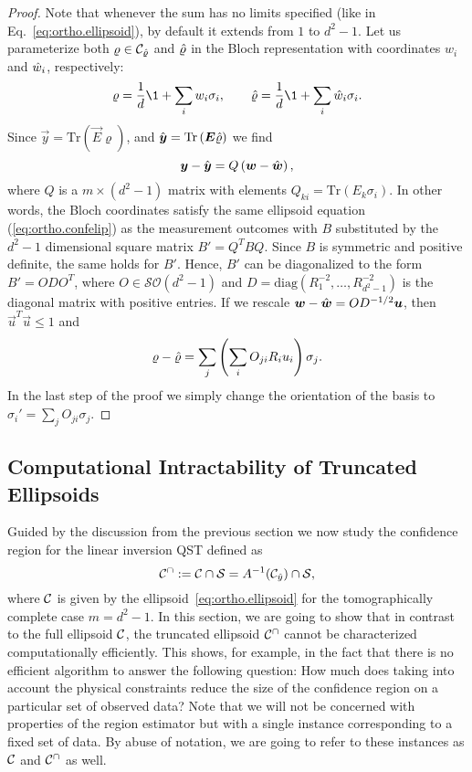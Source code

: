 \begin{proof}
  Note that whenever the sum has no limits specified (like in Eq.~\eqref{eq:ortho.ellipsoid}), by default it extends from $1$ to $d^{2}-1$.
  Let us parameterize both $\varrho \in \mathcal{C}_{\hat{\varrho}}$ and $\hat{\varrho}$ in the Bloch representation with coordinates $w_{i}$ and $\hat{w}_i$, respectively:
  \[
    \varrho=\frac{1}{d}\1 + \sum_{i}w_{i}\sigma_{i},
    \qquad\estim{\varrho}=\frac{1}{d} \1 + \sum_{i}\estim{w}_{i}\sigma_{i}.
  \]
  Since $\vec{y}=\textrm{Tr}\left(\vec{E}\varrho\right)$, and $\hat{\boldsymbol{y}}=\textrm{Tr}\left(\boldsymbol{E}\hat{\varrho}\right)$ we find
  \[
    \boldsymbol{y}-\hat{\boldsymbol{y}}=Q\left(\boldsymbol{w}-\hat{\boldsymbol{w}}\right),
  \]
  where $Q$ is a $m\times(d^{2}-1)$ matrix with elements $Q_{ki}=\textrm{Tr}\left(E_{k}\sigma_{i}\right)$.
  In other words, the Bloch coordinates satisfy the same ellipsoid equation (\ref{eq:ortho.confelip}) as the measurement outcomes with $B$ substituted by the $d^{2}-1$ dimensional square matrix $B'=Q^{T}BQ$.
  Since $B$ is symmetric and positive definite, the same holds for $B'$.
  Hence, $B'$ can be diagonalized to the form $B'=ODO^{T}$, where $O \in \mathcal{SO}(d^2 - 1)$ and $D=\textrm{diag}(R_{1}^{-2},\ldots,R_{d^{2}-1}^{-2})$ is the diagonal matrix with positive entries.
  If we rescale $\boldsymbol{w}-\hat{\boldsymbol{w}}=OD^{-1/2}\boldsymbol{u}$, then $\vec{u}^{T}\vec{u}\leq1$ and
  \[
    \varrho-\hat{\varrho}=\sum_{j}\left(\sum_{i}O_{ji}R_{i}u_{i}\right)\sigma_{j}.
  \]
  In the last step of the proof we simply change the orientation of the basis to $\sigma_{i}'=\sum_{j}O_{ji}\sigma_{j}$.
\end{proof}


\subsection{Computational Intractability of Truncated Ellipsoids}
\label{sub:ortho.hard}

Guided by the discussion from the previous section we now study the confidence region for the linear inversion QST defined as
\[
  \label{eq:ortho.truncated_ellipsoid}
  \mathcal{C}^\cap := \mathcal{C} \cap \mathcal{S} = A^{-1}(\mathcal{C}_{\hat{y}}) \cap \mathcal{S},
\]
where $\mathcal{C}$ is given by the ellipsoid~\eqref{eq:ortho.ellipsoid} for the tomographically complete case $m=d^2 - 1$.
In this section, we are going to show that in contrast to the full ellipsoid $\mathcal{C}$, the truncated ellipsoid $\mathcal{C}^\cap$ cannot be characterized computationally efficiently.
This shows, for example, in the fact that there is no efficient algorithm to answer the following question:
How much does taking into account the physical constraints reduce the size of the confidence region on a particular set of observed data?
Note that we will not be concerned with properties of the region estimator but with a single instance corresponding to a fixed set of data.
By abuse of notation, we are going to refer to these instances as $\mathcal{C}$ and $\mathcal{C}^\cap$ as well.


